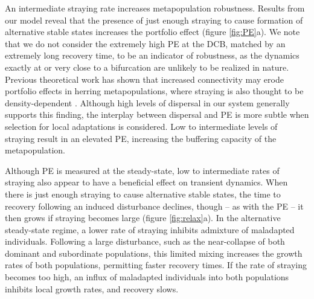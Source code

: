 \documentclass{revtex4}
\begin{document}
An intermediate straying rate increases metapopulation robustness. 
Results from our model reveal that the presence of just enough straying to cause formation of alternative stable states increases the portfolio effect (figure \ref{fig:PE}a). 
We note that we do not consider the extremely high PE at the DCB, matched by an extremely long recovery time, to be an indicator of robustness, as the dynamics exactly at or very close to a bifurcation are unlikely to be realized in nature.
Previous theoretical work has shown that increased connectivity may erode portfolio effects in herring metapopulations, where straying is also thought to be density-dependent \citep{Secor:2009ena}.
Although high levels of dispersal in our system generally supports this finding, the interplay between dispersal and PE is more subtle when selection for local adaptations is considered.
Low to intermediate levels of straying result in an elevated PE, increasing the buffering capacity of the metapopulation.

Although PE is measured at the steady-state, low to intermediate rates of straying also appear to have a beneficial effect on transient dynamics.
When there is just enough straying to cause alternative stable states, the time to recovery following an induced disturbance declines, though -- as with the PE -- it then grows if straying becomes large (figure \ref{fig:relax}a).
In the alternative steady-state regime, a lower rate of straying inhibits admixture of maladapted individuals.
Following a large disturbance, such as the near-collapse of both dominant and subordinate populations, this limited mixing increases the growth rates of both populations, permitting faster recovery times. 
If the rate of straying becomes too high, an influx of maladapted individuals into both populations inhibits local growth rates, and recovery slows.

\end{document}
